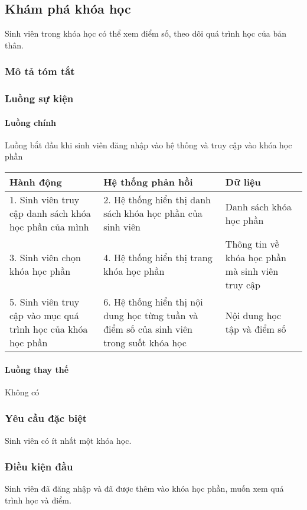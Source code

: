 \documentclass[./../main_file.tex]{subfiles}
\begin{document}
\subsection{Khám phá khóa học}
Sinh viên trong khóa học có thể xem điểm số, theo dõi quá trình học của bản thân.

\subsubsection{Mô tả tóm tắt}
\subsubsection{Luồng sự kiện}
\paragraph{Luồng chính}
 Luồng bắt đầu khi sinh viên đăng nhập vào hệ thống và truy cập vào khóa học phần
\begin{longtable}{|p{}|p{}|p{}|}
		\hline
		\textbf{Hành động}                                 & \textbf{Hệ thống phản hồi}                             & \textbf{Dữ liệu}                                \\ \hline
		1. Sinh viên truy cập danh sách khóa học phần của mình & 2. Hệ thống hiển thị danh sách khóa học phần của sinh viên & Danh sách khóa học phần                          \\ \hline
		3. Sinh viên chọn khóa học phần                        & 4. Hệ thống hiển thị trang khóa học phần                & Thông tin về khóa học phần mà sinh viên truy cập \\ \hline
		5. Sinh viên truy cập vào mục quá trình học của khóa học phần &
		6. Hệ thống hiển thị nội dung học từng tuần và điểm số của sinh viên trong suốt khóa học &
		Nội dung học tập và điểm số \\ \hline
\end{longtable}
\paragraph{Luồng thay thế}
Không có

\subsubsection{Yêu cầu đặc biệt}
Sinh viên có ít nhất một khóa học.

\subsubsection{Điều kiện đầu}
Sinh viên đã đăng nhập và đã được thêm vào khóa học phần, muốn xem quá trình học và điểm.
\end{document}
